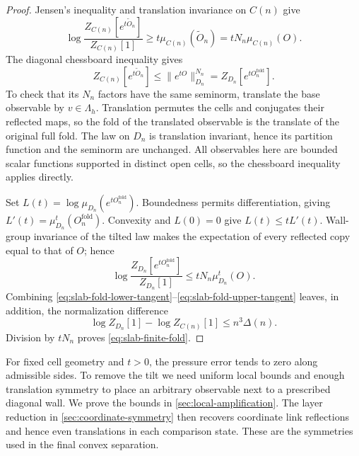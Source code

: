 \documentclass[11pt,letterpaper,reqno]{amsart}
\begin{document}
\begin{proof}
Jensen's inequality and translation invariance on $C(n)$ give
\begin{equation}\label{eq:slab-fold-lower-tangent}
 \log\frac{Z_{C(n)}[e^{t\widetilde O_n}]}{Z_{C(n)}[1]}
                     \ge t\mu_{C(n)}(\widetilde O_n)
                     =tN_n\mu_{C(n)}(O).
\end{equation}
The diagonal chessboard inequality gives
\begin{equation}\label{eq:slab-fold-change}
 Z_{C(n)}[e^{t\widetilde O_n}]
               \le\|e^{tO}\|_{D_n}^{N_n}
               =Z_{D_n}[e^{tO_n^{\mathrm{fold}}}].
\end{equation}
To check that its $N_n$ factors have the same seminorm, translate
the base observable by $v\in\Lambda_h$. Translation permutes the cells
and conjugates their reflected maps, so the fold of the translated
observable is the translate of the original full fold. The law on
$D_n$ is translation invariant, hence its partition function and
the seminorm are unchanged. All observables here are bounded scalar
functions supported in distinct open cells, so the chessboard
inequality applies directly.

Set $L(t)=\log\mu_{D_n}(e^{tO_n^{\mathrm{fold}}})$. Boundedness
permits differentiation, giving
$L'(t)=\mu_{D_n}^t(O_n^{\mathrm{fold}})$. Convexity and $L(0)=0$
give $L(t)\le tL'(t)$. Wall-group invariance of the tilted law makes
the expectation of every reflected copy equal to that of $O$; hence
\begin{equation}\label{eq:slab-fold-upper-tangent}
 \log\frac{Z_{D_n}[e^{tO_n^{\mathrm{fold}}}]}{Z_{D_n}[1]}
                          \le tN_n\mu_{D_n}^t(O).
\end{equation}
Combining \eqref{eq:slab-fold-lower-tangent}--\eqref{eq:slab-fold-upper-tangent}
leaves, in addition, the normalization difference
\[
 \log Z_{D_n}[1]-\log Z_{C(n)}[1]\le n^3\Delta(n).
\]
Division by $tN_n$ proves \eqref{eq:slab-finite-fold}.
\end{proof}

For fixed cell geometry and $t>0$, the pressure error tends to
zero along admissible sides. To remove the tilt we need uniform local
bounds and enough translation symmetry to place an arbitrary observable
next to a prescribed diagonal wall. We prove the bounds in
\cref{sec:local-amplification}. The layer reduction in
\cref{sec:coordinate-symmetry} then recovers coordinate link reflections
and hence even translations in each comparison state. These are the
symmetries used in the final convex separation.
\end{document}
